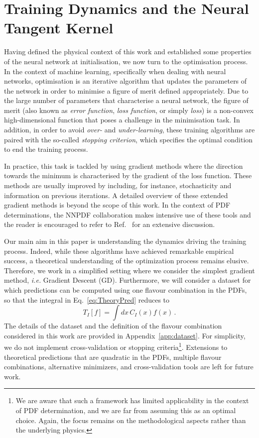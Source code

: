 \section{Training Dynamics and the Neural Tangent Kernel}
\label{sec:Training}

Having defined the physical context of this work and established some properties
of the neural network at initialisation, we now turn to the optimisation
process. In the context of machine learning, specifically when dealing with
neural networks, optimisation is an iterative algorithm that updates the
parameters of the network in order to minimise a figure of merit defined
appropriately. Due to the large number of parameters that characterise a neural
network, the figure of merit (also known as \textit{error function},
\textit{loss function}, or simply \textit{loss}) is a non-convex
high-dimensional function that poses a challenge in the minimisation task. In
addition, in order to avoid \textit{over-} and \textit{under-learning}, these
training algorithms are paired with the so-called \textit{stopping criterion},
which specifies the optimal condition to end the training process.

In practice, this task is tackled by using gradient methods where the direction
towards the minimum is characterised by the gradient of the loss function. These
methods are usually improved by including, for instance, stochasticity and
information on previous iterations. A detailed overview of these extended
gradient methods is beyond the scope of this work. In the context of PDF
determinations, the NNPDF collaboration makes intensive use of these tools and
the reader is encouraged to refer to Ref.~\cite{NNPDF:2021njg} for an extensive
discussion.

Our main aim in this paper is understanding the dynamics driving the training
process. Indeed, while these algorithms have achieved remarkable empirical
success, a theoretical understanding of the optimization process remains
elusive. Therefore, we work in a simplified setting where we consider the
simplest gradient method, \textit{i.e.} Gradient Descent (GD). Furthermore, we
will consider a dataset for which predictions can be computed using one flavour
combination in the PDFs, so that the integral in Eq.~\eqref{eq:TheoryPred}
reduces to
\begin{equation}
    \label{eq:TheoryPredSingleFlav}
    T_I[f] = \int dx\, C_{I}(x) f(x)\,.
\end{equation}
The details of the dataset and the definition of the flavour combination
considered in this work are provided in Appendix~\ref{app:dataset}.
For simplicity, we do not implement cross-validation or stopping
criteria\footnote{ We are aware that such a framework has limited applicability
in the context of PDF determination, and we are far from assuming this as an
optimal choice. Again, the focus remains on the methodological aspects rather
than the underlying physics.}. Extensions to theoretical predictions that are
quadratic in the PDFs, multiple flavour combinations, alternative minimizers,
and cross-validation tools are left for future work.

